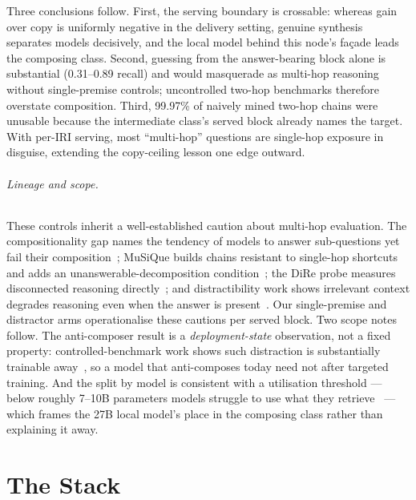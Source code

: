 \documentclass[10pt,twocolumn]{article}
\begin{document}
Three conclusions follow. First, the serving boundary is crossable: whereas gain over copy is
uniformly negative in the delivery setting, genuine synthesis separates models decisively, and
the local model behind this node's fa\c{c}ade leads the composing class. Second, guessing from
the answer-bearing block alone is substantial (0.31--0.89 recall) and would masquerade as
multi-hop reasoning without single-premise controls; uncontrolled two-hop benchmarks therefore
overstate composition. Third, 99.97\% of naively mined two-hop chains were unusable because the
intermediate class's served block already names the target. With per-IRI serving, most
``multi-hop'' questions are single-hop exposure in disguise, extending the copy-ceiling lesson
one edge outward.

\paragraph{Lineage and scope.} These controls inherit a well-established caution about multi-hop evaluation. The compositionality gap names the tendency of models to answer sub-questions yet fail their composition~\cite{press2023compgap}; MuSiQue builds chains resistant to single-hop shortcuts and adds an unanswerable-decomposition condition~\cite{musique2022}; the DiRe probe measures disconnected reasoning directly~\cite{dire2020}; and distractibility work shows irrelevant context degrades reasoning even when the answer is present~\cite{shi2023distracted,faithfate2023}. Our single-premise and distractor arms operationalise these cautions per served block. Two scope notes follow. The anti-composer result is a \emph{deployment-state} observation, not a fixed property: controlled-benchmark work shows such distraction is substantially trainable away~\cite{gsmdc2025}, so a model that anti-composes today need not after targeted training. And the split by model is consistent with a utilisation threshold --- below roughly 7--10B parameters models struggle to use what they retrieve~\cite{retrievalutil2026} --- which frames the 27B local model's place in the composing class rather than explaining it away.





\part{The Stack}
\end{document}
